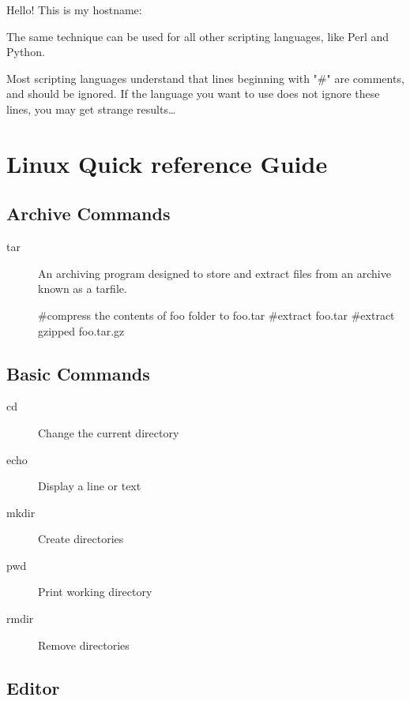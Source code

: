 \begin{prompt}
Hello! This is my hostname:
\end{prompt}

The same technique can be used for all other scripting languages, like Perl and Python.

Most scripting languages understand that lines beginning with "\#" are
comments, and should be ignored. If the language you want to use does not
ignore these lines, you may get strange results\ldots

\section{Linux Quick reference Guide}

\subsection{Archive Commands}

\begin{description}

  \item[tar] An archiving program designed to store and extract files from an
archive known as a tarfile.

\begin{prompt}
#compress the contents of foo folder to foo.tar
#extract foo.tar
#extract gzipped foo.tar.gz
\end{prompt}

\end{description}

\subsection{Basic Commands}

\begin{description}
  \item[cd]  Change the current directory
  \item[echo]  Display a line or text
  \item[mkdir]  Create directories
  \item[pwd] Print working directory
  \item[rmdir]  Remove directories
\end{description}

\subsection{Editor}

